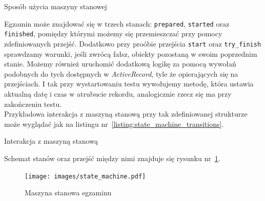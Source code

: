 \documentclass[a4paper,12pt]{article}
\begin{document}
\begin{listing}
  
  \caption{Sposób użycia maszyny stanowej}
  \label{listing:state_machine}
\end{listing}


Egzamin może znajdować się w trzech stanach: \texttt{prepared}, \texttt{started} oraz
\texttt{finished}, pomiędzy którymi możemy się przemieszczać przy pomocy zdefiniowanych
przejść. Dodatkowo przy proóbie przejścia \texttt{start} oraz \texttt{try\_finish}
sprawdzamy warunki, jeśli zwrócą fałsz, obiekty pozostaną w swoim poprzednim stanie.
Możemy również uruchomić dodatkową logikę za pomocą wywołań podobnych do tych dostępnych w
\emph{ActiveRecord}, tyle że opierających się na przejściach. I tak przy wystartowaniu
testu wywołujemy metodę, która ustawia aktualną datę i czas w atrubucie rekordu,
analogicznie rzecz się ma przy zakończeniu testu.\\
Przykładowa interakcja z maszyną stanową przy tak zdefiniowanej strukturze może wyglądać
jak na listingu nr~\ref{listing:state_machine_transitions}.

\begin{listing}
  
  \caption{Interakcja z maszyną stanową}
  \label{listing:state_machine_transitions}
\end{listing}


Schemat stanów oraz przejść między nimi znajduje się rysunku nr~\ref{fig:state_machine}.

\begin{figure}[ht]
  \begin{center}
    \texttt{[image: images/state\_machine.pdf]}
  \end{center}
  \caption{Maszyna stanowa egzaminu}
  \label{fig:state_machine}
\end{figure}
\end{document}
